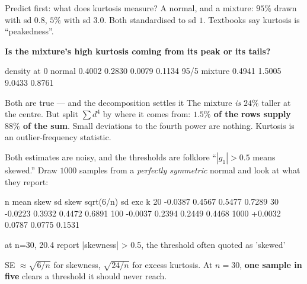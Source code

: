 \documentclass[aspectratio=169]{beamer}
\begin{document}
\begin{frame}[fragile,shrink=6]{Predict first: what does kurtosis measure?}
A normal, and a mixture: $95\%$ drawn with sd $0.8$, $5\%$ with sd $3.0$.
Both standardised to sd $1$. Textbooks say kurtosis is ``peakedness''.
\vspace{0.3em}
\begin{center}
  \textbf{Is the mixture's high kurtosis coming from its peak or its tails?}
\end{center}
\begin{outblk}
                density at 0     %
normal                0.4002      0.2830         0.0079             0.1134
95/5 mixture          0.4941      1.5005         9.0433             0.8761
\end{outblk}
\begin{alertblock}{Both are true --- and the decomposition settles it}
  \footnotesize The mixture \emph{is} $24\%$ taller at the centre. But split
  $\sum d^4$ by where it comes from: \textbf{$1.5\%$ of the rows supply $88\%$
  of the sum}. Small deviations to the fourth power are nothing. Kurtosis is
  an outlier-frequency statistic.
\end{alertblock}
\end{frame}

\begin{frame}[fragile,shrink=6]{Both estimates are noisy, and the thresholds are folklore}
``$|g_1| > 0.5$ means skewed.'' Draw $1000$ samples from a \emph{perfectly
symmetric} normal and look at what they report:
\begin{outblk}
     n    mean skew    sd skew      sqrt(6/n)   sd exc k
    20      -0.0387     0.4567         0.5477     0.7289
    30      -0.0223     0.3932         0.4472     0.6891
   100      -0.0037     0.2394         0.2449     0.4468
  1000      +0.0032     0.0787         0.0775     0.1531

at n=30, 20.4%
report |skewness| > 0.5, the threshold often quoted as 'skewed'
\end{outblk}
\begin{center}\small
  SE $\approx\sqrt{6/n}$ for skewness, $\sqrt{24/n}$ for excess kurtosis.
  At $n=30$, \textbf{one sample in five} clears a threshold it should never
  reach.
\end{center}
\end{frame}
\end{document}
